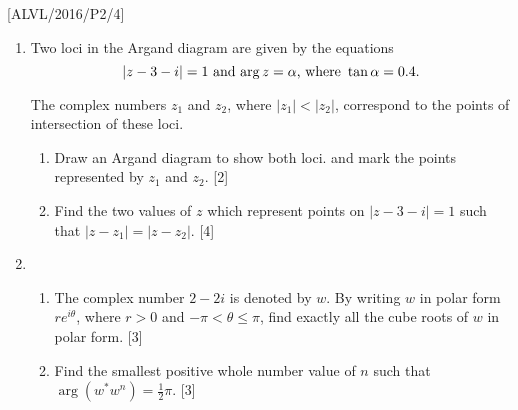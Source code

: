 \item {[}ALVL/2016/P2/4{]}
\begin{enumerate}
\item Two loci in the Argand diagram are given by the equations 
\[
\left|z-3-i\right|=1\,\,\text{and}\,\,\text{\ensuremath{\arg z=\alpha},\,\,where }\tan\alpha=0.4.
\]

The complex numbers $z_{1}$ and $z_{2}$, where $\left|z_{1}\right|<\left|z_{2}\right|$,
correspond to the points of intersection of these loci.
\begin{enumerate}
\item Draw an Argand diagram to show both loci. and mark the points represented
by $z_{1}$ and $z_{2}$. \hfill{} {[}2{]}
\item Find the two values of $z$ which represent points on $\left|z-3-i\right|=1$
such that $\left|z-z_{1}\right|=\left|z-z_{2}\right|$. \hfill{}{[}4{]}
\end{enumerate}
\item {}
\begin{enumerate}
\item The complex number $2-2i$ is denoted by $w$. By writing $w$ in
polar form $re^{i\theta}$, where $r>0$ and $-\pi<\theta\leq\pi$,
find exactly all the cube roots of $w$ in polar form. \hfill{} {[}3{]}
\item Find the smallest positive whole number value of $n$ such that $\arg\left(w^{*}w^{n}\right)=\frac{1}{2}\pi$.
\hfill{} {[}3{]}
\end{enumerate}
\end{enumerate}
